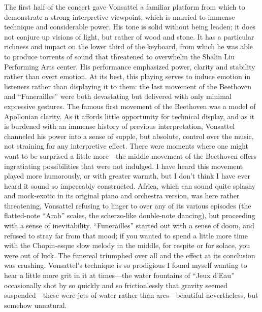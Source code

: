The first half of the concert gave Vonsattel a familiar platform from which to demonstrate a strong interpretive viewpoint, which is married to immense technique and considerable power. His tone is solid without being leaden; it does not conjure up visions of light, but rather of wood and stone. It has a particular richness and impact on the lower third of the keyboard, from which he was able to produce torrents of sound that threatened to overwhelm the Shalin Liu Performing Arts center. His performance emphasized power, clarity and stability rather than overt emotion. At its best, this playing serves to induce emotion in listeners rather than displaying it to them: the last movement of the Beethoven and “Funerailles” were both devastating but delivered with only minimal expressive gestures. The famous first movement of the Beethoven was a model of Apollonian clarity. As it affords little opportunity for technical display, and as it is burdened with an immense history of previous interpretation, Vonsattel channeled his power into a sense of supple, but absolute, control over the music, not straining for any interpretive effect. There were moments where one might want to be surprised a little more—the middle movement of the Beethoven offers ingratiating possibilities that were not indulged. I have heard this movement played more humorously, or with greater warmth, but I don’t think I have ever heard it sound so impeccably constructed. Africa, which can sound quite splashy and mock-exotic in its original piano and orchestra version, was here rather threatening, Vonsattel refusing to linger to over any of its various episodes (the flatted-note “Arab” scales, the scherzo-like double-note dancing), but proceeding with a sense of inevitability. “Funerailles” started out with a sense of doom, and refused to stray far from that mood; if you wanted to spend a little more time with the Chopin-esque slow melody in the middle, for respite or for solace, you were out of luck. The funereal triumphed over all and the effect at its conclusion was crushing. Vonsattel’s technique is so prodigious I found myself wanting to hear a little more grit in it at times—the water fountains of “Jeux d’Eau” occasionally shot by so quickly and so frictionlessly that gravity seemed suspended—these were jets of water rather than arcs—beautiful nevertheless, but somehow unnatural.


